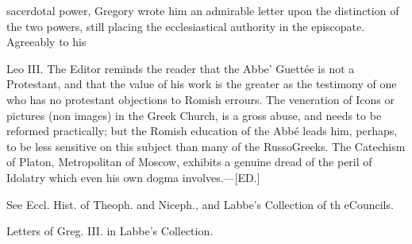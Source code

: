 sacerdotal power, Gregory wrote him an admirable letter upon the distinction of the two powers, still placing the ecclesiastical authority in the episcopate. Agreeably to his

Leo III. The Editor reminds the reader that the Abbe’ Guettée is not a Protestant, and that the value of his work is the greater as the testimony of one who has no protestant objections to Romish errours. The veneration of Icons or pictures (non images) in the Greek Church, is a gross abuse, and needs to be reformed practically; but the Romish education of the Abbé leads him, perhaps, to be less sensitive on this subject than many of the RussoGreeks. The Catechism of Platon, Metropolitan of Moscow, exhibits a genuine dread of the peril of Idolatry which even his own dogma involves.—[ED.]

See Eccl. Hist. of Theoph. and Niceph., and Labbe’s Collection of th eCouncils.

Letters of Greg. III. in Labbe’s Collection.


